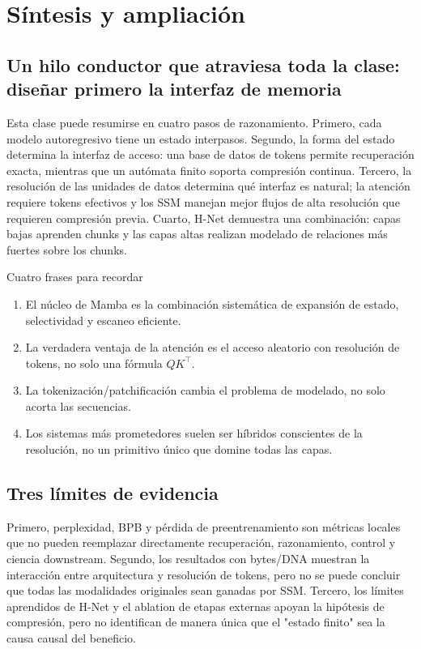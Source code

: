 \section{Síntesis y ampliación}

\subsection{Un hilo conductor que atraviesa toda la clase: diseñar primero la interfaz de memoria}

Esta clase puede resumirse en cuatro pasos de razonamiento. Primero, cada modelo autoregresivo tiene un estado interpasos. Segundo, la forma del estado determina la interfaz de acceso: una base de datos de tokens permite recuperación exacta, mientras que un autómata finito soporta compresión continua. Tercero, la resolución de las unidades de datos determina qué interfaz es natural; la atención requiere tokens efectivos y los SSM manejan mejor flujos de alta resolución que requieren compresión previa. Cuarto, H-Net demuestra una combinación: capas bajas aprenden chunks y las capas altas realizan modelado de relaciones más fuertes sobre los chunks.

\begin{importantbox}{Cuatro frases para recordar}
\begin{enumerate}
  \item El núcleo de Mamba es la combinación sistemática de expansión de estado, selectividad y escaneo eficiente.
  \item La verdadera ventaja de la atención es el acceso aleatorio con resolución de tokens, no solo una fórmula $QK^\top$.
  \item La tokenización/patchificación cambia el problema de modelado, no solo acorta las secuencias.
  \item Los sistemas más prometedores suelen ser híbridos conscientes de la resolución, no un primitivo único que domine todas las capas.
\end{enumerate}
\end{importantbox}

\subsection{Tres límites de evidencia}

Primero, perplexidad, BPB y pérdida de preentrenamiento son métricas locales que no pueden reemplazar directamente recuperación, razonamiento, control y ciencia downstream. Segundo, los resultados con bytes/DNA muestran la interacción entre arquitectura y resolución de tokens, pero no se puede concluir que todas las modalidades originales sean ganadas por SSM. Tercero, los límites aprendidos de H-Net y el ablation de etapas externas apoyan la hipótesis de compresión, pero no identifican de manera única que el "estado finito" sea la causa causal del beneficio.

